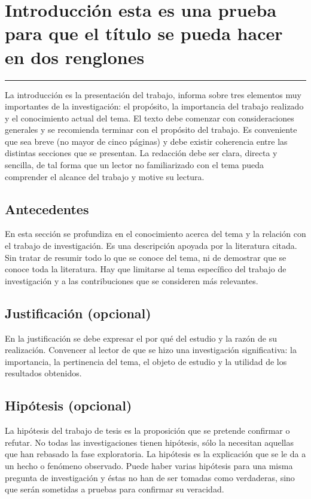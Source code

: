 \chapter{Introducci\'on esta es una prueba para que el título se pueda hacer en dos renglones}\label{capit:cap1}
\vspace{-2.0325ex}%
\noindent
\rule{\textwidth}{0.5pt}
\vspace{-5.5ex}%
\newcommand{\pushline}{\Indp}%

La introducción es la presentación del trabajo, informa sobre tres elementos muy importantes de la investigación: el propósito, la importancia del trabajo realizado y el conocimiento actual del tema. El texto debe comenzar con consideraciones generales y se recomienda terminar con el propósito del trabajo. Es conveniente que sea breve (no mayor de cinco páginas) y debe existir coherencia entre las distintas secciones que se presentan. La redacción debe ser clara, directa y sencilla, de tal forma que un lector no familiarizado con el tema pueda comprender el alcance del trabajo y motive su lectura.

\section{Antecedentes}\label{secc:antece}
En esta sección se profundiza en el conocimiento acerca del tema y la relación con el trabajo de investigación. Es una descripción apoyada por la literatura citada. Sin tratar de resumir todo lo que se conoce del tema, ni de demostrar que se conoce toda la literatura. Hay que limitarse al tema específico del trabajo de investigación y a las contribuciones que se consideren más relevantes.

\section{Justificaci\'on (opcional)}\label{secc:jus}

En la justificación se debe expresar el por qué del estudio y la razón de su realización. Convencer al lector de que se hizo una investigación significativa: la importancia, la pertinencia del tema, el objeto de estudio y la utilidad de los resultados obtenidos.

\section{Hip\'otesis (opcional)}\label{secc:hipot}
La hipótesis del trabajo de tesis es la proposición que se pretende confirmar o refutar. No todas las investigaciones tienen hipótesis, sólo la necesitan aquellas que han rebasado la fase exploratoria. La hipótesis es la explicación que se le da a un hecho o fenómeno observado. Puede haber varias hipótesis para una misma pregunta de investigación y éstas no han de ser tomadas como verdaderas, sino que serán sometidas a pruebas para confirmar su veracidad.

